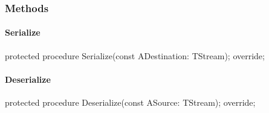 \documentclass{report}
\newif\ifpdf
\begin{document}
\subsubsection*{\large{\textbf{Methods}}\normalsize\hspace{1ex}\hfill}
\paragraph*{Serialize}\hspace*{\fill}

\label{PasDoc_Items.TPasEnum-Serialize}
\begin{list}{}{
\setlength{\itemindent}{0cm}
\setlength{\listparindent}{0cm}
\setlength{\leftmargin}{\evensidemargin}
\addtolength{\leftmargin}{\tmplength}
\settowidth{\labelsep}{X}
\addtolength{\leftmargin}{\labelsep}
\setlength{\labelwidth}{\tmplength}
}
\item[\textbf{Declaration}\hfill]
\ifpdf
\begin{flushleft}
\fi
\begin{ttfamily}
protected procedure Serialize(const ADestination: TStream); override;\end{ttfamily}

\ifpdf
\end{flushleft}
\fi

\end{list}
\paragraph*{Deserialize}\hspace*{\fill}

\label{PasDoc_Items.TPasEnum-Deserialize}
\begin{list}{}{
\setlength{\itemindent}{0cm}
\setlength{\listparindent}{0cm}
\setlength{\leftmargin}{\evensidemargin}
\addtolength{\leftmargin}{\tmplength}
\settowidth{\labelsep}{X}
\addtolength{\leftmargin}{\labelsep}
\setlength{\labelwidth}{\tmplength}
}
\item[\textbf{Declaration}\hfill]
\ifpdf
\begin{flushleft}
\fi
\begin{ttfamily}
protected procedure Deserialize(const ASource: TStream); override;\end{ttfamily}

\ifpdf
\end{flushleft}
\fi

\end{list}
\end{document}
